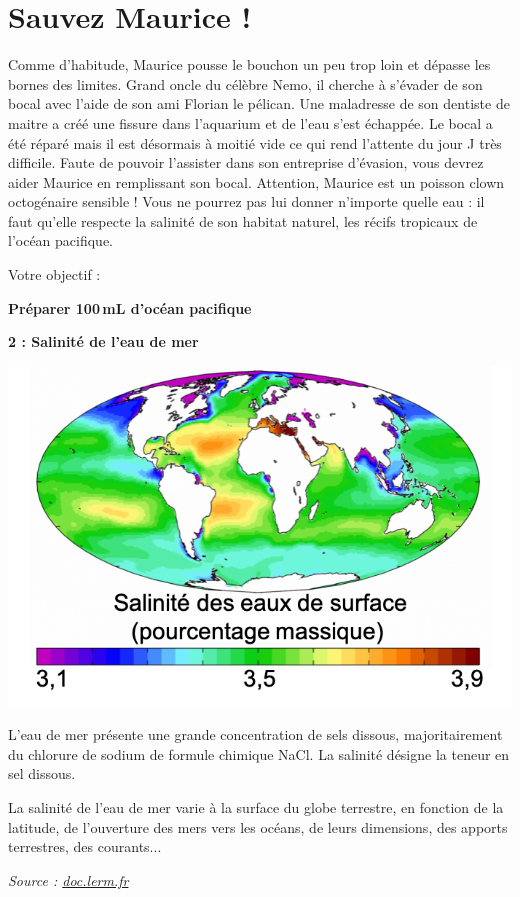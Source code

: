 \section*{Sauvez Maurice !}

Comme d'habitude, Maurice pousse le bouchon un peu trop loin et dépasse les bornes des limites.
Grand oncle du célèbre Nemo, il cherche à s'évader de son bocal avec l'aide de son ami Florian le pélican.
Une maladresse de son dentiste de maitre a créé une fissure dans l'aquarium et de l'eau s'est échappée.
Le bocal a été réparé mais il est désormais à moitié vide ce qui rend l'attente du jour J très difficile.
Faute de pouvoir l'assister dans son entreprise d'évasion, vous devrez aider Maurice en remplissant son bocal.
Attention, Maurice est un poisson clown octogénaire sensible !
Vous ne pourrez pas lui donner n'importe quelle eau : il faut qu'elle respecte la salinité de son habitat naturel, les récifs tropicaux de l'océan pacifique.

Votre objectif :
\begin{objectif}
\textbf{Préparer 100\,mL d'océan pacifique}
\end{objectif}

\begin{doc}
\textbf{2 : Salinité de l'eau de mer}
\begin{multicols}{2}
\begin{center}
\includegraphics[scale=0.6]{images/salinite_fr.png}
\end{center}

L'eau de mer présente une grande concentration de sels dissous, majoritairement du chlorure de sodium  de formule chimique NaCl.
La salinité désigne la teneur en sel dissous.

La salinité de l'eau de mer varie à la surface du globe terrestre, en fonction de la latitude, de l'ouverture des mers vers les océans, de leurs dimensions, des apports terrestres, des courants...

\flushright \textit{Source : \href{http://doc.lerm.fr/salinite-leau-mer/}{doc.lerm.fr}}

\end{multicols}
\end{doc}

